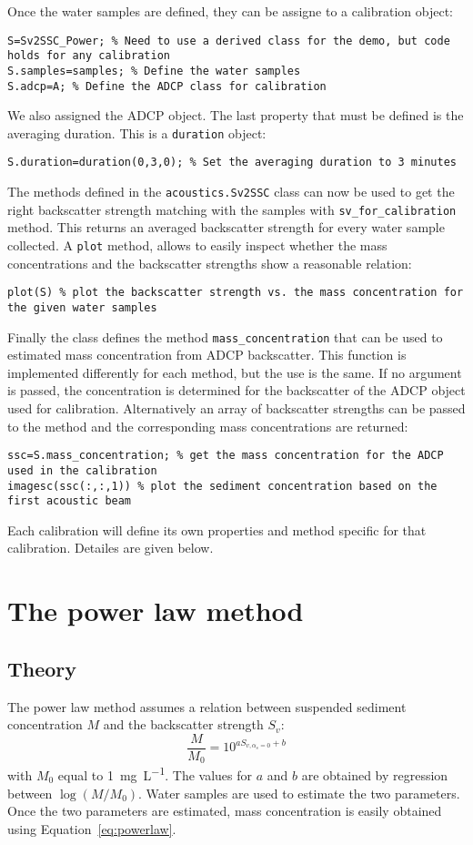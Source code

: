 \documentclass[]{article}
\begin{document}
Once the water samples are defined, they can be assigne to a calibration object:
\begin{lstlisting}
S=Sv2SSC_Power; % Need to use a derived class for the demo, but code holds for any calibration
S.samples=samples; % Define the water samples
S.adcp=A; % Define the ADCP class for calibration
\end{lstlisting}
We also assigned the ADCP object. The last property that must be defined is the averaging duration. This is a \lstinline!duration! object:
\begin{lstlisting}
S.duration=duration(0,3,0); % Set the averaging duration to 3 minutes
\end{lstlisting}
The methods defined in the \lstinline!acoustics.Sv2SSC! class can now be used to get the right backscatter strength matching with the samples with \lstinline!sv_for_calibration! method. This returns an averaged backscatter strength for every water sample collected. A \lstinline!plot! method, allows to easily inspect whether the mass concentrations and the backscatter strengths show a reasonable relation:
\begin{lstlisting}
plot(S) % plot the backscatter strength vs. the mass concentration for the given water samples
\end{lstlisting}

Finally the class defines the method \lstinline!mass_concentration! that can be used to estimated mass concentration from ADCP backscatter. This function is implemented differently for each method, but the use is the same. If no argument is passed, the concentration is determined for the backscatter of the ADCP object used for calibration. Alternatively an array of backscatter strengths can be passed to the method and the corresponding mass concentrations are returned:
\begin{lstlisting}
ssc=S.mass_concentration; % get the mass concentration for the ADCP used in the calibration
imagesc(ssc(:,:,1)) % plot the sediment concentration based on the first acoustic beam
\end{lstlisting}

Each calibration will define its own properties and method specific for that calibration. Detailes are given below.
\section{The power law method}
\subsection{Theory}
The power law method assumes a relation between suspended sediment concentration $M$ and the backscatter strength $S_v$:
\begin{equation}
  \frac{M}{M_0}=10^{aS_{v,\alpha_s=0}+b}
  \label{eq:powerlaw}
\end{equation}
with $M_0$ equal to \SI{1}{\milli\g\per\liter}. The values for $a$ and $b$ are obtained by regression between $\log(M/M_0)$. Water samples are used to estimate the two parameters. Once the two parameters are estimated, mass concentration is easily obtained using Equation~\ref{eq:powerlaw}.
\end{document}
